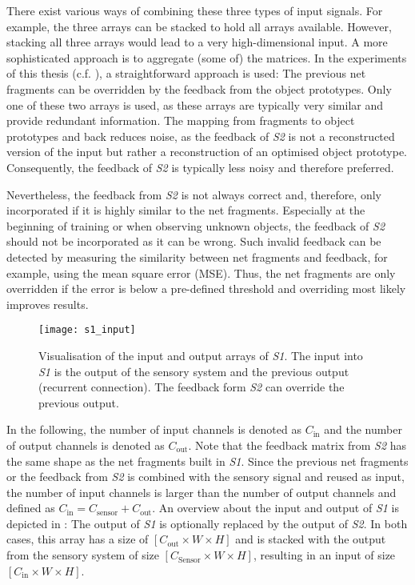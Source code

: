 There exist various ways of combining these three types of input signals. For example, the three arrays can be stacked to hold all arrays available.
However, stacking all three arrays would lead to a very high-dimensional input.
A more sophisticated approach is to aggregate (some of) the matrices.
In the experiments of this thesis (c.f. ), a straightforward approach is used: The previous net fragments can be overridden by the feedback from the object prototypes.
Only one of these two arrays is used, as these arrays are typically very similar and provide redundant information. The mapping from fragments to object prototypes and back reduces noise, as the feedback of \emph{S2} is not a reconstructed version of the input but rather a reconstruction of an optimised object prototype. Consequently, the feedback of \emph{S2} is typically less noisy and therefore preferred.

Nevertheless, the feedback from \emph{S2} is not always correct and, therefore, only incorporated if it is highly similar to the net fragments. Especially at the beginning of training or when observing unknown objects, the feedback of \emph{S2} should not be incorporated as it can be wrong.
Such invalid feedback can be detected by measuring the similarity between net fragments and feedback, for example, using the mean square error (MSE). Thus, the net fragments are only overridden if the error is below a pre-defined threshold and overriding most likely improves results.

\begin{figure}[h]
    \centering
    \texttt{[image: s1\_input]}
    \caption[Input and output of \emph{S1}]{Visualisation of the input and output arrays of \emph{S1}. The input into \emph{S1} is the output of the sensory system and the previous output (recurrent connection). The feedback form \emph{S2} can override the previous output.}
\end{figure}


In the following, the number of input channels is denoted as $C_{\text{in}}$ and the number of output channels is denoted as $C_{\text{out}}$.
Note that the feedback matrix from \emph{S2} has the same shape as the net fragments built in \emph{S1}.
Since the previous net fragments or the feedback from \emph{S2} is combined with the sensory signal and reused as input, the number of input channels is larger than the number of output channels and defined as $C_{\text{in}} = C_{\text{sensor}} + C_{\text{out}}$.
An overview about the input and output of \emph{S1} is depicted in :
The output of \emph{S1} is optionally replaced by the output of \emph{S2}. In both cases, this array has a size of $[C_{\text{out}} \times W \times H]$ and is stacked with the output from the sensory system of size $[C_{\text{Sensor}} \times W \times H]$, resulting in an input of size $[C_{\text{in}} \times W \times H]$.


